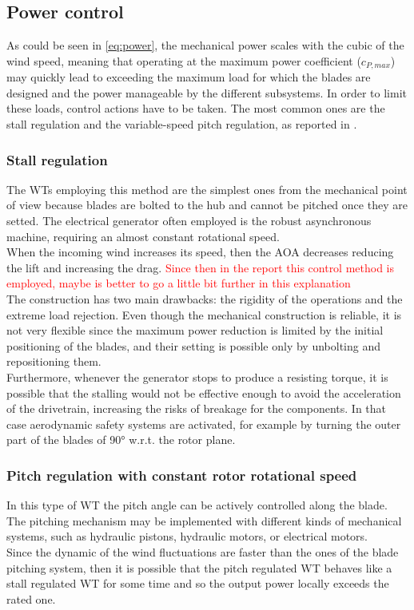 \subsection{Power control}
As could be seen in \autoref{eq:power}, the mechanical power scales with the cubic of the wind speed, meaning that operating at the maximum power coefficient ($c_{P, max}$) may quickly lead to exceeding the maximum load for which the blades are designed and the power manageable by the different subsystems. In order to limit these loads, control actions have to be taken. The most common ones are the stall regulation and the variable-speed pitch regulation, as reported in \cite{Aerodynamics_of_wind_turbines}.
\subsubsection{Stall regulation}\label{subsec:stall_regulation_theory}
The \acrshort{WTs} employing this method are the simplest ones from the mechanical point of view because blades are bolted to the hub and cannot be pitched once they are setted. The electrical generator often employed is the robust asynchronous machine, requiring an almost constant rotational speed.\\
When the incoming wind increases its speed, then the \acrshort{AOA} decreases reducing the lift and increasing the drag. \textcolor{red}{Since then in the report this control method is employed, maybe is better to go a little bit further in this explanation}\\
The construction has two main drawbacks: the rigidity of the operations and the extreme load rejection. Even though the mechanical construction is reliable, it is not very flexible since the maximum power reduction is limited by the initial positioning of the blades, and their setting is possible only by unbolting and repositioning them.\\
Furthermore, whenever the generator stops to produce a resisting torque, it is possible that the stalling would not be effective enough to avoid the acceleration of the drivetrain, increasing the risks of breakage for the components. In that case aerodynamic safety systems are activated, for example by turning the outer part of the blades of 90$\si{\degree}$ w.r.t. the rotor plane. 

\subsubsection{Pitch regulation with constant rotor rotational speed}
In this type of \acrshort{WT} the pitch angle can be actively controlled along the blade. The pitching mechanism may be implemented with different kinds of mechanical systems, such as hydraulic pistons, hydraulic motors, or electrical motors. \\
Since the dynamic of the wind fluctuations are faster than the ones of the blade pitching system, then it is possible that the pitch regulated WT behaves like a stall regulated \acrshort{WT} for some time and so the output power locally exceeds the rated one.

